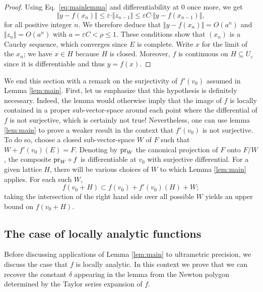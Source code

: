 \documentclass{lms}
\begin{document}
\begin{proof}
Using Eq.~\eqref{eq:mainlemma} and differentiability at $0$ once more,
we get
$$\Vert y  - f(x_n) \Vert 
\leq \varepsilon \cdot \Vert z_{n-1} \Vert \leq \varepsilon C \cdot \Vert 
y - f(x_{n-1}) \Vert,$$
for all positive integer $n$.  We therefore deduce that $\Vert y - f(x_n) \Vert = O(a^n)$ and 
$\Vert z_n \Vert = O(a^n)$ with $a = \varepsilon C < \rho \leq 1$. 
These conditions show that $(x_n)$ is a Cauchy sequence, which converges since $E$ is complete.
Write $x$ for the limit of the $x_n$; we have $x \in H$ because $H$ is closed.
Moreover, $f$ is continuous on $H \subseteq U_\varepsilon$ since it is differentiable and thus $y=f(x)$.
\end{proof}

We end this section with a remark on the surjectivity of $f'(v_0)$ assumed in
Lemma \ref{lem:main}. First, let us 
emphasize that this hypothesis is definitely necessary. Indeed, the lemma would 
otherwise imply that the image of $f$ is locally contained in a proper 
sub-vector-space around each point where the differential of $f$ is not 
surjective, which is certainly not true! Nevertheless, one can use lemma \ref{lem:main}
to prove a weaker result in the context that $f'(v_0)$ is not surjective.
To do so, choose a closed sub-vector-space $W$ of $F$ such that $W + f'(v_0)(E) = 
F$. Denoting by $\text{\rm pr}_W$ the canonical projection of $F$ onto 
$F/W$, the composite $\text{\rm pr}_W \circ f$ is differentiable at 
$v_0$ with surjective differential. For a given lattice $H$, there will be various choices of $W$ to which Lemma \ref{lem:main}
applies.  For each such $W$,
\begin{equation}
\label{eq:notsurjective}
f(v_0 + H) \subset f(v_0) + f'(v_0)(H) + W;
\end{equation}
taking the intersection of the right hand side
over all possible $W$ yields an upper bound on $f(v_0 + H)$.

\subsection{The case of locally analytic functions}
\label{ssec:locanalytic}


Before discussing applications of Lemma \ref{lem:main} to ultrametric 
precision, we discuss the case that $f$ is locally analytic.  In this context
we prove that we can recover the constant $\delta$ appearing in the lemma
from the Newton polygon determined by the Taylor series expansion of $f$.
\end{document}

